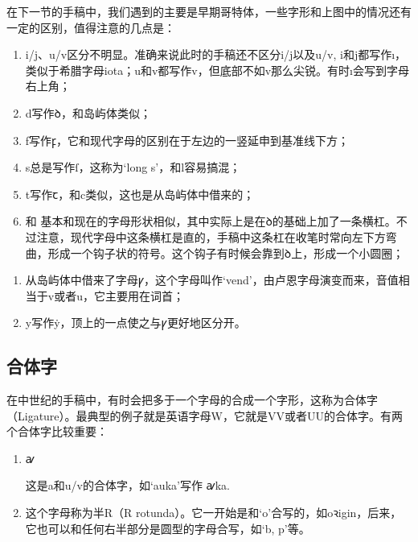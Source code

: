 在下一节的手稿中，我们遇到的主要是早期哥特体，一些字形和上图中的情况还有一定的区别，值得注意的几点是：
\begin{info}
    \begin{enumerate}[leftmargin=*]
        \item i/j、u/v区分不明显。准确来说此时的手稿还不区分i/j以及u/v, i和j都写作ı，类似于希腊字母iota；u和v都写作v，但底部不如v那么尖锐。有时ı会写到字母右上角；

        \item d写作{\medieval ꝺ}，和岛屿体类似；

        \item f写作{\medieval ꝼ}，它和现代字母的区别在于左边的一竖延申到基准线下方；

        \item s总是写作{\medieval ſ}，这称为`long s'，和l容易搞混；

        \item t写作{\medieval ꞇ}，和c类似，这也是从岛屿体中借来的；

        \item \th 和 \dh 基本和现在的字母形状相似，其中\dh 实际上是在{\medieval ꝺ}的基础上加了一条横杠。不过注意，现代字母中这条横杠是直的，手稿中这条杠在收笔时常向左下方弯曲，形成一个钩子状的符号。这个钩子有时候会靠到{\medieval ꝺ}上，形成一个小圆圈；
    \end{enumerate}
\end{info}
\begin{info}
    \begin{enumerate}[leftmargin=*, start=7]

        \item 从岛屿体中借来了字母{\medieval ꝩ}，这个字母叫作`vend'，由卢恩字母演变而来，音值相当于v或者u，它主要用在词首；

        \item y写作\.y，顶上的一点使之与{\medieval ꝩ}更好地区分开。
    \end{enumerate}
\end{info}
\subsection{合体字}
在中世纪的手稿中，有时会把多于一个字母的合成一个字形，这称为合体字（Ligature）。最典型的例子就是英语字母W，它就是VV或者UU的合体字。有两个合体字比较重要：
\begin{enumerate}[itemindent=1em]
    \item  {\andron ꜹ}

          这是a和u/v的合体字，如`auka'写作 {\andron ꜹka}.

    \item {}

          这个字母称为半R（R rotunda）。它一开始是和`o'合写的，如{\andron o{\andron ꝛ}igin}，后来，它也可以和任何右半部分是圆型的字母合写，如`b, p'等。
\end{enumerate}

